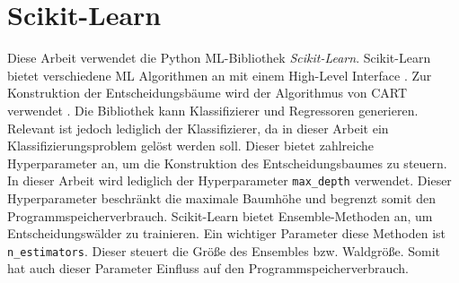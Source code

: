 \section{Scikit-Learn}
Diese Arbeit verwendet die Python ML-Bibliothek \textit{Scikit-Learn}. Scikit-Learn bietet verschiedene ML Algorithmen an mit einem High-Level Interface \cite{scikit-learn}.
Zur Konstruktion der Entscheidungsbäume wird der Algorithmus von CART verwendet \cite{ScikitLearnCART}.
Die Bibliothek kann Klassifizierer und Regressoren generieren.
\newline
\newline
Relevant ist jedoch lediglich der Klassifizierer, da in dieser Arbeit ein Klassifizierungsproblem gelöst werden soll. Dieser bietet zahlreiche Hyperparameter an, um die Konstruktion des
Entscheidungsbaumes zu steuern. In dieser Arbeit wird lediglich der Hyperparameter \texttt{max\_depth} verwendet. Dieser Hyperparameter beschränkt die maximale Baumhöhe und begrenzt somit
den Programmspeicherverbrauch.
\newline
\newline
Scikit-Learn bietet Ensemble-Methoden an, um Entscheidungswälder zu trainieren. Ein wichtiger Parameter diese Methoden ist \texttt{n\_estimators}. Dieser steuert die Größe des Ensembles bzw.
Waldgröße. Somit hat auch dieser Parameter Einfluss auf den Programmspeicherverbrauch.